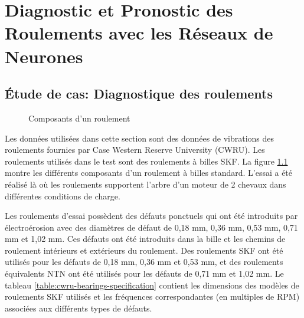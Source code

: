 \chapter{Diagnostic et Pronostic des Roulements avec les Réseaux de Neurones}
\label{chapter:diagnostic-and-prognostic-of-bearings-using-neural-networks}

\section{Étude de cas: Diagnostique des roulements}%
\label{sec:etude_de_cas_diagnostique_des_roulements}

\begin{figure}
    \centering
	
	\caption{Composants d'un roulement}
    \label{figure:skf-bearing-components}    
\end{figure}

Les données utilisées dans cette section sont des données de vibrations des roulements fournies par Case Western Reserve University (CWRU). Les roulements utilisés dans le test sont des roulements à billes SKF. La figure \ref{figure:skf-bearing-components} montre les différents composants d'un roulement à billes standard. L'essai a été réalisé là où les roulements supportent l'arbre d'un moteur de 2 chevaux dans différentes conditions de charge. 

Les roulements d'essai possèdent des défauts ponctuels qui ont été introduits par électroérosion avec des diamètres de défaut de 0,18 mm, 0,36 mm, 0,53 mm, 0,71 mm et 1,02 mm. Ces défauts ont été introduits dans la bille et les chemins de roulement intérieurs et extérieurs du roulement. Des roulements SKF ont été utilisés pour les défauts de 0,18 mm, 0,36 mm et 0,53 mm, et des roulements équivalents NTN ont été utilisés pour les défauts de 0,71 mm et 1,02 mm. Le tableau \ref{table:cwru-bearings-specification} contient les dimensions des modèles de roulements SKF utilisés et les fréquences correspondantes (en multiples de RPM) associées aux différents types de défauts.


